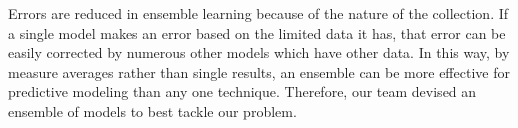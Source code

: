 Errors are reduced in ensemble learning because of the nature of the collection. If a single model makes an error based on the limited data it has, that error can be easily corrected by numerous other models which have other data. In this way, by measure averages rather than single results, an ensemble can be more effective for predictive modeling than any one technique. Therefore, our team devised an ensemble of models to best tackle our problem. 
